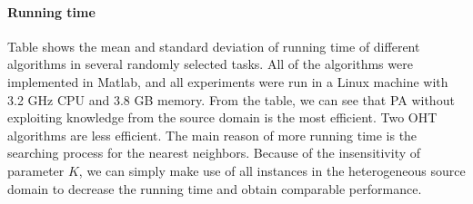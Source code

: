 \documentclass[twocolumn]{article}
\begin{document}
\paragraph{Running time}
Table shows the mean and standard deviation of running time of different algorithms in several randomly selected tasks.
All of the algorithms were implemented in Matlab, and all experiments were run in a Linux machine with 3.2 GHz CPU and 3.8 GB memory.
From the table, we can see that PA without exploiting knowledge from the source domain is the most efficient.
Two OHT algorithms are less efficient.
The main reason of more running time is the searching process for the nearest neighbors.
Because of the insensitivity of parameter $K$, we can simply make use of all instances in the heterogeneous source domain to decrease the running time and obtain comparable performance.
\end{document}

